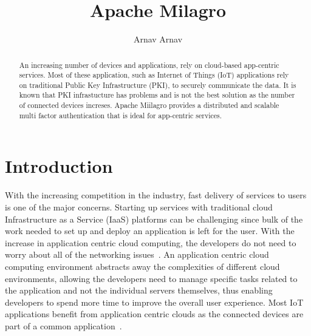 
\title{Apache Milagro}


\author{Arnav Arnav}

\renewcommand{\shortauthors}{Arnav}


\begin{abstract}
An increasing number of devices and applications, rely on cloud-based
app-centric services. Most of these application, such as Internet of
Things (IoT) applications rely on traditional Public Key
Infrastructure (PKI), to securely communicate the data. It is known
that PKI infrastucture has problems and is not the best solution as
the number of connected devices increses.  Apache Miilagro provides a
distributed and scalable multi factor authentication that is ideal for
app-centric services.
\end{abstract}


\maketitle

\section{Introduction}
With the increasing competition in the industry, fast delivery of
services to users is one of the major concerns. Starting up services
with traditional cloud Infrastructure as a Service (IaaS) platforms
can be challenging since bulk of the work needed to set up and deploy
an application is left for the user. With the increase in application
centric cloud computing, the developers do not need to worry about all
of the networking issues~\cite{bmc-app-centric}. An application
centric cloud computing environment abstracts away the complexities of
different cloud environments, allowing the developers need to manage
specific tasks related to the application and not the individual
servers themselves, thus enabling developers to spend more time to
improve the overall user experience. Most IoT applications benefit
from application centric clouds as the connected devices are part of a
common application~\cite{vb-app-centric}.

